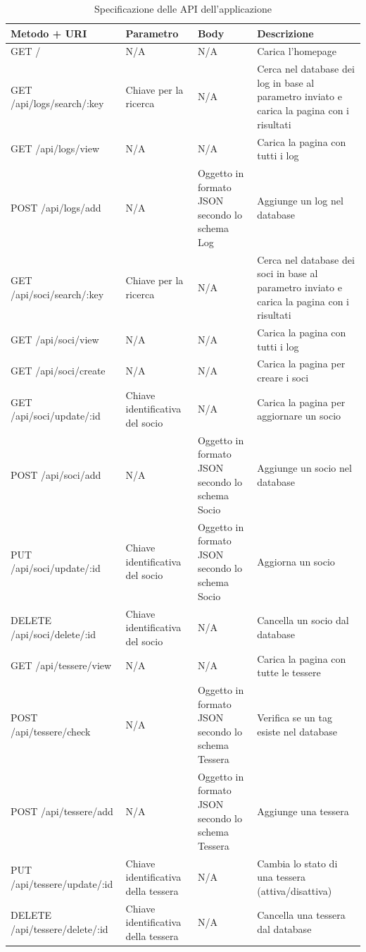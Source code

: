 \documentclass[12pt]{report}
\begin{document}
\begin{table}[H]
	\scriptsize
	\centering
	\renewcommand\arraystretch{1.8}
	\renewcommand\tabcolsep{3.0pt}
	\begin{tabularx}{\textwidth}{|L|L|L|L|}
		\hline
		\textbf{Metodo + URI} & \textbf{Parametro} & \textbf{Body} & \textbf{Descrizione} \\
		\hline                              
		GET / & N/A & N/A & Carica l'homepage \\ 
		\hline
		GET /api/logs/search/:key & Chiave per la ricerca & N/A 
		& Cerca nel database dei log in base al parametro inviato e carica la pagina con i risultati \\
		\hline
		GET /api/logs/view & N/A & N/A & Carica la pagina con tutti i log \\
		\hline  
		POST /api/logs/add & N/A & Oggetto in formato JSON secondo lo schema Log & Aggiunge un log nel database \\
		\hline
		GET /api/soci/search/:key & Chiave per la ricerca & N/A & Cerca nel database dei soci in base al parametro inviato e carica la pagina con i risultati \\ 
		\hline
		GET /api/soci/view & N/A & N/A & Carica la pagina con tutti i log \\ 
		\hline
		GET /api/soci/create & N/A & N/A & Carica la pagina per creare i soci \\ 
		\hline
		GET /api/soci/update/:id & Chiave identificativa del socio & N/A & Carica la pagina per aggiornare un socio \\ 
		\hline
		POST /api/soci/add & N/A & Oggetto in formato JSON secondo lo schema Socio & Aggiunge un socio nel database \\ 
		\hline
		PUT /api/soci/update/:id & Chiave identificativa del socio & Oggetto in formato JSON secondo lo schema Socio & Aggiorna un socio \\ 
		\hline
		DELETE /api/soci/delete/:id & Chiave identificativa del socio & N/A & Cancella un socio dal database \\ 
		\hline
		GET /api/tessere/view & N/A & N/A & Carica la pagina con tutte le tessere \\ 
		\hline
		POST /api/tessere/check & N/A & Oggetto in formato JSON secondo lo schema Tessera & Verifica se un tag esiste nel database \\
		\hline
		POST /api/tessere/add & N/A & Oggetto in formato JSON secondo lo schema Tessera & Aggiunge una tessera \\ 
		\hline
		PUT /api/tessere/update/:id & Chiave identificativa della tessera & N/A & Cambia lo stato di una tessera (attiva/disattiva) \\ 
		\hline
		DELETE /api/tessere/delete/:id & Chiave identificativa della tessera & N/A & Cancella una tessera dal database \\ 
		\hline
	\end{tabularx}
	\caption{Specificazione delle API dell'applicazione}
	\label{tab:api}
\end{table}    
\end{document}
